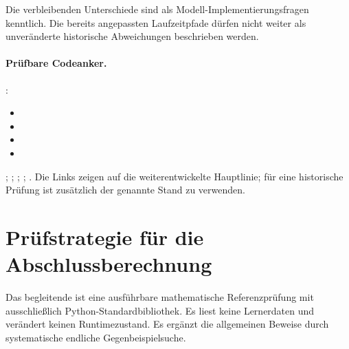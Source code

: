 Die verbleibenden Unterschiede sind als Modell-Implementierungsfragen
kenntlich. Die bereits angepassten Laufzeitpfade dürfen nicht weiter als
unveränderte historische Abweichungen beschrieben werden.

\begin{center}\begin{minipage}{\linewidth}
\paragraph{Prüfbare Codeanker.}
:
\begin{itemize}\small
\item {}
\item {}
\item {}
\item {}
\end{itemize}
;
;
;
;
.
Die Links zeigen auf die weiterentwickelte Hauptlinie; für eine historische
Prüfung ist zusätzlich der genannte Stand zu verwenden.
\end{minipage}\end{center}

\section{Prüfstrategie für die Abschlussberechnung}
Das begleitende  ist eine
ausführbare mathematische Referenzprüfung mit ausschließlich
Python-Standardbibliothek. Es liest keine Lernerdaten und verändert
keinen Runtimezustand. Es ergänzt die allgemeinen Beweise durch
systematische endliche Gegenbeispielsuche.

